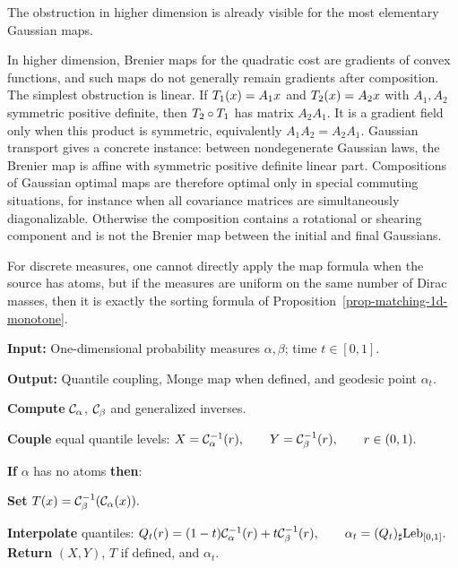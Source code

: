 The obstruction in higher dimension is already visible for the most elementary Gaussian maps.

\begin{example}
	In higher dimension, Brenier maps for the quadratic cost are gradients of convex functions, and such maps do not generally remain gradients after composition. The simplest obstruction is linear. If $T_1(x)=A_1x$ and $T_2(x)=A_2x$ with $A_1,A_2$ symmetric positive definite, then $T_2\circ T_1$ has matrix $A_2A_1$. It is a gradient field only when this product is symmetric, equivalently $A_1A_2=A_2A_1$. Gaussian transport gives a concrete instance: between nondegenerate Gaussian laws, the Brenier map is affine with symmetric positive definite linear part. Compositions of Gaussian optimal maps are therefore optimal only in special commuting situations, for instance when all covariance matrices are simultaneously diagonalizable. Otherwise the composition contains a rotational or shearing component and is not the Brenier map between the initial and final Gaussians.
\end{example}

For discrete measures, one cannot directly apply the map formula when the source has atoms, but if the measures are uniform on the same number of Dirac masses, then it is exactly the sorting formula of Proposition~\ref{prop-matching-1d-monotone}.

\begin{alg}\label{alg:quantile-rearrangement-geodesic}
\textbf{Input:} One-dimensional probability measures $\alpha,\beta$; time $t\in[0,1]$.

\textbf{Output:} Quantile coupling, Monge map when defined, and geodesic point $\alpha_t$.

\textbf{Compute} $\mathcal{C}_{\alpha}$, $\mathcal{C}_{\beta}$ and generalized inverses.

\textbf{Couple} equal quantile levels:
\(X=\mathcal{C}_{\alpha}^{-1}(r), \qquad Y=\mathcal{C}_{\beta}^{-1}(r), \qquad r\in(0,1).\)

\textbf{If} $\alpha$ has no atoms \textbf{then}:
\begin{algblock}

\textbf{Set}
\(T(x)=\mathcal{C}_{\beta}^{-1}(\mathcal{C}_{\alpha}(x)).\)
\end{algblock}
\textbf{Interpolate} quantiles:
\(Q_t(r)=(1-t)\mathcal{C}_{\alpha}^{-1}(r)+t\mathcal{C}_{\beta}^{-1}(r), \qquad \alpha_t=(Q_t)_\sharp\mathrm{Leb}_{[0,1]}.\)
\textbf{Return} $(X,Y)$, $T$ if defined, and $\alpha_t$.
\end{alg}

